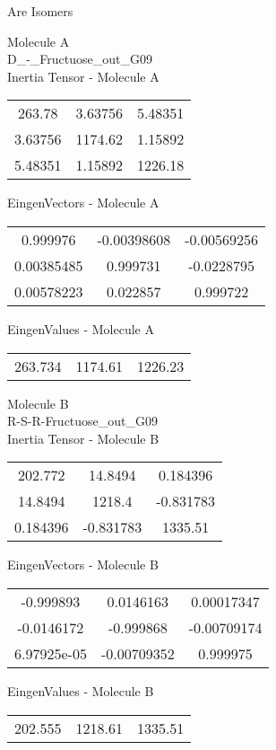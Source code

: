 \begin{center}
\vtab
\vtab
\textcolor{NavyBlue}{\Large Are Isomers}
\end{center}
\newpage
\begin{multicols}{2}
\begin{center}
Molecule A \\ 
D\_-\_Fructuose\_out\_G09
\\
Inertia Tensor - Molecule A \\
\vtab
\begin{tabular}{|c c c|}
263.78	 & 	3.63756	 & 	5.48351	 \\
3.63756	 & 	1174.62	 & 	1.15892	 \\
5.48351	 & 	1.15892	 & 	1226.18
\end{tabular}

\vtab
 EingenVectors - Molecule A     \\
\vtab
\begin{tabular}{|c c c|}
0.999976	 & 	-0.00398608	 & 	-0.00569256	 \\
0.00385485	 & 	0.999731	 & 	-0.0228795	 \\
0.00578223	 & 	0.022857	 & 	0.999722
\end{tabular}

\vtab
 EingenValues - Molecule A     \\
\vtab
\begin{tabular}{|c c c|}
263.734	 & 	1174.61	 & 	1226.23
\end{tabular}
\columnbreak

Molecule B \\ 
R-S-R-Fructuose\_out\_G09
\\
Inertia Tensor - Molecule B \\
\vtab
\begin{tabular}{|c c c|}
202.772	 & 	14.8494	 & 	0.184396	 \\
14.8494	 & 	1218.4	 & 	-0.831783	 \\
0.184396	 & 	-0.831783	 & 	1335.51
\end{tabular}

\vtab
 EingenVectors - Molecule B     \\
\vtab
\begin{tabular}{|c c c|}
-0.999893	 & 	0.0146163	 & 	0.00017347	 \\
-0.0146172	 & 	-0.999868	 & 	-0.00709174	 \\
6.97925e-05	 & 	-0.00709352	 & 	0.999975
\end{tabular}

\vtab
 EingenValues - Molecule B     \\
\vtab
\begin{tabular}{|c c c|}
202.555	 & 	1218.61	 & 	1335.51
\end{tabular}

\end{center}
\end{multicols}
